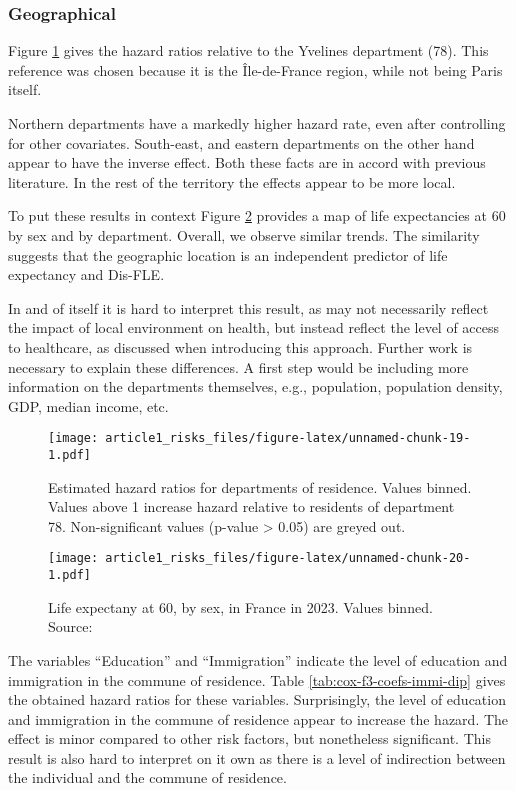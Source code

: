 \documentclass[risks,article,submit,moreauthors,pdftex]{Definitions/mdpi}
\begin{document}
\hypertarget{geographical}{%
\subsubsection{Geographical}\label{geographical}}

Figure \ref{fig:cox-f3-coefs-dep} gives the hazard ratios relative to
the Yvelines department (78). This reference was chosen because it is
the Île-de-France region, while not being Paris itself.

Northern departments have a markedly higher hazard rate, even after
controlling for other covariates. South-east, and eastern departments on
the other hand appear to have the inverse effect. Both these facts are
in accord with previous literature. In the rest of the territory the
effects appear to be more local.

To put these results in context Figure \ref{fig:insee-le-dep} provides a
map of life expectancies at 60 by sex and by department. Overall, we
observe similar trends. The similarity suggests that the geographic
location is an independent predictor of life expectancy and Dis-FLE.

In and of itself it is hard to interpret this result, as may not
necessarily reflect the impact of local environment on health, but
instead reflect the level of access to healthcare, as discussed when
introducing this approach. Further work is necessary to explain these
differences. A first step would be including more information on the
departments themselves, e.g., population, population density, GDP,
median income, etc.

\begin{figure}
\centering
\texttt{[image: article1\_risks\_files/figure-latex/unnamed-chunk-19-1.pdf]}
\caption{\label{fig:cox-f3-coefs-dep} Estimated hazard ratios for
departments of residence. Values binned. Values above 1 increase hazard
relative to residents of department 78. Non-significant values (p-value
\textgreater{} 0.05) are greyed out.}
\end{figure}

\begin{figure}
\centering
\texttt{[image: article1\_risks\_files/figure-latex/unnamed-chunk-20-1.pdf]}
\caption{\label{fig:insee-le-dep} Life expectany at 60, by sex, in
France in 2023. Values binned. Source: \citep{insee_esperances_2023}}
\end{figure}

The variables ``Education'' and ``Immigration'' indicate the level of
education and immigration in the commune of residence. Table
\ref{tab:cox-f3-coefs-immi-dip} gives the obtained hazard ratios for
these variables. Surprisingly, the level of education and immigration in
the commune of residence appear to increase the hazard. The effect is
minor compared to other risk factors, but nonetheless significant. This
result is also hard to interpret on it own as there is a level of
indirection between the individual and the commune of residence.
\end{document}
